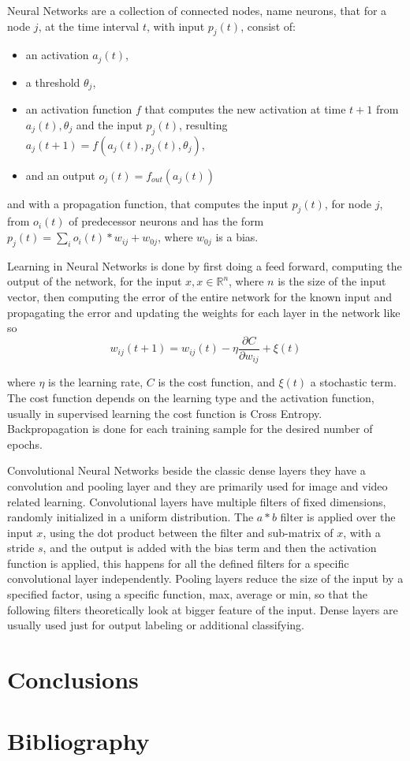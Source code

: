 \documentclass[12pt]{article}
\theoremstyle{definition}
\begin{document}
	Neural Networks are a collection of connected nodes, name neurons, that for a node $j$, at the time interval $t$, with input  $p_j(t)$, consist of:
	\begin{itemize}
		\item an activation $a_j(t)$,
		\item a threshold $\theta_j$,
		\item an activation function $f$ that computes the new activation at time $t+1$ from $a_j(t), \theta_j$ and the input $p_j(t)$, resulting $a_j(t+1)=f(a_j(t), p_j(t), \theta_j)$,
		\item and an output $o_j(t)=f_{out}(a_j(t))$
	\end{itemize}
	and with a propagation function, that computes the input $p_j(t)$, for node $j$, from $o_i(t)$ of predecessor neurons and has the form $p_j(t)=\sum_io_i(t)*w_{ij} + w_{0j}$, where $w_{0j}$ is a bias.
	
	Learning in Neural Networks is done by first doing a feed forward, computing the output of the network, for the input $x, x \in \mathbb{R}^n$, where $n$ is the size of the input vector, then computing the error of the entire network for the known input and propagating the error and updating the weights for each layer in the network like so
	\begin{equation*}
		w_{ij}(t+1)=w_{ij}(t)-\eta\frac{\partial C}{\partial w_{ij}}+ \xi(t)
	\end{equation*}
	
	where $\eta$ is the learning rate, $C$ is the cost function, and $\xi(t)$ a stochastic term. The cost function depends on the learning type and the activation function, usually in supervised learning the cost function is Cross Entropy. Backpropagation is done for each training sample for the desired number of epochs.
	
	Convolutional Neural Networks beside the classic dense layers they have a convolution and pooling layer and they are primarily used for image and video related learning.
	Convolutional layers have multiple filters of fixed dimensions, randomly initialized in a uniform distribution. The $a*b$ filter is applied over the input $x$, using the dot product between the filter and sub-matrix of $x$,  with a stride $s$, and the output is added with the bias term and then the activation function is applied, this happens for all the defined filters for a specific convolutional layer independently. Pooling layers reduce the size of the input by a specified factor, using a specific function, max, average or min, so that the following filters theoretically look at bigger feature of the input. Dense layers are usually used just for output labeling or additional classifying.
	
	\newpage
	
	\section{Conclusions}
	\vspace{1cm}
	
	\newpage
	
	\section{Bibliography}
	
	
	
\end{document}

